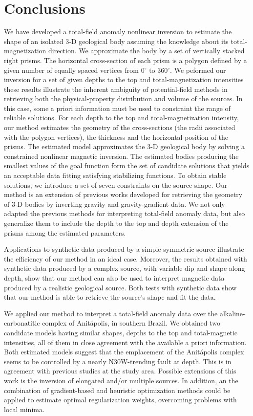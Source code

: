 \section{Conclusions}

We have developed a total-field anomaly nonlinear inversion to estimate the shape 
of an isolated 3-D geological body assuming the knowledge about its 
total-magnetization direction. We approximate the body by a set of vertically 
stacked right prisms. The horizontal cross-section of each prism is a polygon 
defined by a given number of equally spaced vertices from 0$^\circ$ to 360$^\circ$. 
We peformed our inversion for a set of given depths to the top and total-magnetization 
intensities these results illustrate the inherent ambiguity of potential-field methods in 
retrieving both the physical-property distribution and volume of the sources. 
In this case, some a priori information must 
be used to constraint the range of reliable solutions. For each depth to the top and total-magnetization intensity,
our method estimates the geometry of the cross-sections (the radii associated with the polygon vertices), the thickness and 
the horizontal position of the prisms. The estimated model approximates the 3-D geological body by 
solving a constrained nonlinear magnetic inversion.
The estimated bodies producing the smallest values of the goal function form the 
set of candidate solutions that yields an acceptable data fitting satisfying stabilizing functions. 
To obtain stable solutions, we introduce a set of seven constraints on the source 
shape.
Our method is an extension of previous works developed for retrieving the geometry 
of 3-D bodies by inverting gravity and gravity-gradient data. 
We not only adapted the previous methods for interpreting total-field anomaly data,
but also generalize them to include the depth to the top and depth extension of 
the prisms among the estimated parameters.

Applications to synthetic data produced by a simple symmetric source 
illustrate the efficiency of our method in an ideal case. Moreover, the results 
obtained with synthetic data produced by a complex source, with variable dip and 
shape along depth, show that our method can also be used to interpret magnetic 
data produced by a realistic geological source. 
Both tests with synthetic data show that our method is able to retrieve the 
source's shape and fit the data.

We applied our method to interpret a total-field anomaly data over the 
alkaline-carbonatitic complex of Anit{\'a}polis, in southern Brazil. 
We obtained two candidate models having similar shapes, depths to the top and 
total-magnetic intensities, all of them in close agreement with the available 
a priori information. Both estimated models suggest that the emplacement of the 
Anit{\'a}polis complex seems to be controlled by a nearly N30W-trending fault at depth.
This is in agreement with previous studies at the study area.
Possible extensions of this work is the inversion of elongated and/or multiple 
sources. In addition, an the combination of gradient-based and heuristic optimization 
methods could be applied to estimate optimal regularization weights, 
overcoming problems with local minima.